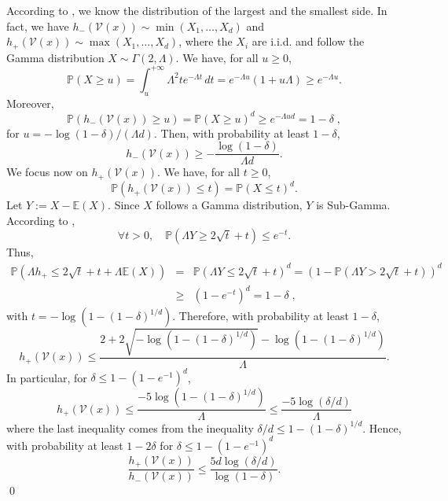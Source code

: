 \documentclass[paper=a4, fontsize=11pt]{scrartcl}
\newcommand{\EE}{\mathbb{E}}
\begin{document}
According to \cite[Proposition 1]{minimaxmondrian}, we know the distribution of the largest and the smallest side. In fact, we have \( h_-(\mathcal V (x)) \sim \min(X_1, \dots, X_d) \) and \( h_+(\mathcal V (x)) \sim \max(X_1, \dots, X_d) \), where the \( X_i \) are i.i.d. and follow the Gamma distribution \( X \sim \Gamma(2, \Lambda) \). We have, for all $u \geq 0$,
\[ \mathbb{P}(X \geq u) = \int_u^{+\infty} \Lambda^2 t e^{-\Lambda t} \, dt = e^{-\Lambda u} (1 + u \Lambda) \geq e^{-\Lambda u}. \]
Moreover,
\[ \mathbb{P}(h_-(\mathcal V (x)) \geq u) = \mathbb{P}(X \geq u)^d \geq e^{-\Lambda u d} = 1 - \delta\; , \]
for \( u = -{\log(1-\delta)}/{(\Lambda d)}. \)
Then, with probability at least $1 - \delta$,
\begin{equation}\label{h-}
h_-(\mathcal V (x)) \geq - \dfrac{\log(1-\delta)}{\Lambda d}.    
\end{equation}
We focus now on \( h_+(\mathcal V (x)) \). We have, for all $t \geq 0$,
\[ \mathbb{P}(h_+(\mathcal V (x)) \leq t) = \mathbb{P}(X \leq t)^d. \]
Let \( Y := X - \EE(X) \). Since \( X \) follows a Gamma distribution, \( Y \) is Sub-Gamma. According to \cite[p. 29]{boucheron2013concentration},
\[ \forall t > 0, \quad \mathbb{P}(\Lambda Y \geq 2\sqrt{t} + t) \leq e^{-t}. \]
Thus,
\begin{eqnarray*}
    \mathbb{P}(\Lambda h_+ \leq 2 \sqrt{t} + t + \Lambda \EE(X)) &=& \mathbb{P}(\Lambda Y \leq 2 \sqrt{t} + t)^d = \left(1 - \mathbb{P}(\Lambda Y > 2 \sqrt{t} + t)\right)^d \\ &\geq& (1 - e^{-t})^d = 1 - \delta\; ,
\end{eqnarray*}
with \( t = - \log(1-(1-\delta)^{1/d}). \)
Therefore, with probability at least \(1 - \delta\),
$$h_+(\mathcal V (x)) \leq \frac{2 + 2\sqrt{- \log(1-(1-\delta)^{1/d})} - \log(1-(1-\delta)^{1/d})}{\Lambda}.$$
In particular, for \( \delta \leq 1 - (1 - e^{-1})^d \),
\begin{equation}\label{h+} 
h_+(\mathcal V (x)) \leq \frac{-5 \log(1-(1-\delta)^{1/d})}{\Lambda} \leq \dfrac{-5\log(\delta/d)}{\Lambda} 
\end{equation}
where the last inequality comes from the inequality \( \delta/d \leq 1 - (1 - \delta)^{1/d} \).
Hence, with probability at least \(1 - 2\delta\) for $\delta \leq 1 - (1 - e^{-1})^d$
\[ \frac{h_+(\mathcal V (x))}{h_-(\mathcal V (x))} \leq \frac{5d \log(\delta/d)}{{\log(1-\delta)}}. \]
\qed
\end{document}
